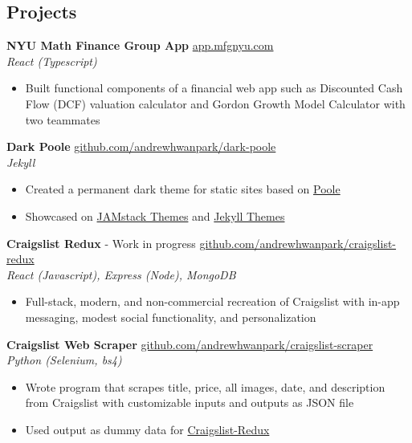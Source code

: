 \documentclass[margin]{res}
\begin{document}
\begin{resume}
	\section{Projects} 
	{\bf NYU Math Finance Group App} \hfill\href{https://github.com/mfg-nyu/app}{app.mfgnyu.com}\\
	{\it React (Typescript)}
	\begin{itemize} \itemsep -2pt
		\item Built functional components of a financial web app such as Discounted Cash Flow (DCF) valuation calculator and Gordon Growth Model Calculator with two teammates
	\end{itemize}
	
	{\bf Dark Poole} \hfill \href{https://github.com/andrewhwanpark/dark-poole}{github.com/andrewhwanpark/dark-poole}\\
	{\it Jekyll}
	\begin{itemize} \itemsep -2pt
		\item Created a permanent dark theme for static sites based on \href{https://github.com/poole/poole}{Poole}
		\item Showcased on \href{https://jamstackthemes.dev/theme/dark-poole/}{JAMstack Themes} and \href{https://jekyll-themes.com/dark-poole/}{Jekyll Themes}
	\end{itemize}
	
	{\bf Craigslist Redux} - Work in progress \hfill \href{https://github.com/andrewhwanpark/craigslist-redux}{github.com/andrewhwanpark/craigslist-redux}\\
	{\it React (Javascript), Express (Node), MongoDB}
	\begin{itemize} \itemsep -2pt
		\item Full-stack, modern, and non-commercial recreation of Craigslist with in-app messaging, modest social functionality, and personalization
	\end{itemize}
	
	{\bf Craigslist Web Scraper} \hfill \href{https://github.com/andrewhwanpark/craigslist-scraper}{github.com/andrewhwanpark/craigslist-scraper}\\
	{\it Python (Selenium, bs4)}
	\begin{itemize} \itemsep -2pt
		\item Wrote program that scrapes title, price, all images, date, and description from Craigslist with customizable inputs and outputs as JSON file
		\item Used output as dummy data for \href{https://github.com/andrewhwanpark/craigslist-redux}{Craigslist-Redux}
	\end{itemize}
	

\end{resume}
\end{document}

